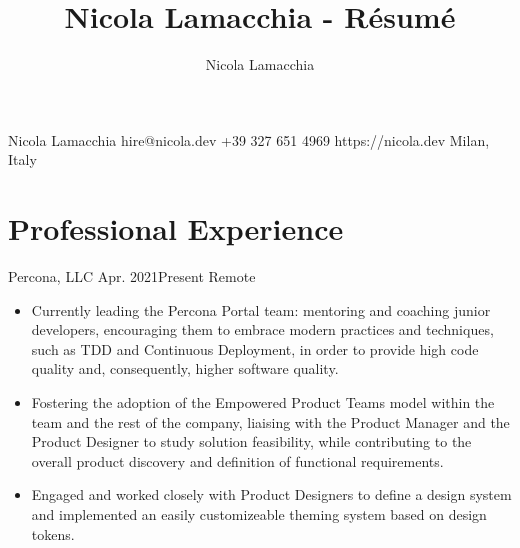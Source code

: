 \documentclass{resume}
\title{Nicola Lamacchia - Résumé}
\author{Nicola Lamacchia}
\begin{document}
\heading%
    {Nicola}
    {Lamacchia}
    {}
    {hire@nicola.dev}%
    {+39 327 651 4969}%
    {https://nicola.dev}
    {Milan, Italy}

\separator[cvlightgray]


\section{Professional Experience}

\begin{cvsection}
        {Percona, LLC}%
        {Apr. 2021}{Present}%
        {Remote}%
        {%
            \begin{itemize}
                \item Currently leading the Percona Portal team: mentoring and
                    coaching junior developers, encouraging them to embrace
                    modern practices and techniques, such as TDD and Continuous
                    Deployment, in order to provide high code quality and,
                    consequently, higher software quality.
                \item Fostering the adoption of the Empowered Product Teams
                    model within the team and the rest of the company, liaising
                    with the Product Manager and the Product Designer to
                    study solution feasibility, while contributing to the
                    overall product discovery and definition of functional
                    requirements.
                \item Engaged and worked closely with Product Designers to
                    define a design system and implemented an easily
                    customizeable theming system based on design tokens.
            \end{itemize}
        }


\end{cvsection}
\end{document}

